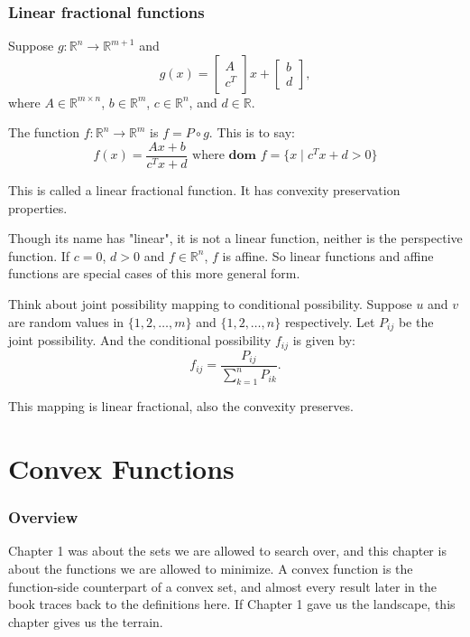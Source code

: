 \documentclass[lang=en,color=blue,mode=fancy,titlestyle=hang]{elegantbook}
\begin{document}
\subsection{Linear fractional functions}

Suppose $g: \mathbb{R}^n \rightarrow \mathbb{R}^{m+1}$ and
\[
g(x)= \begin{bmatrix} A\\ c^T \end{bmatrix} x + \begin{bmatrix} b \\ d \end{bmatrix},
\]
where $A \in \mathbb{R}^{m \times n}$, $b \in \mathbb{R}^m$, $c \in \mathbb{R}^n$, and
$d \in \mathbb{R}$.

The function $f: \mathbb{R}^n \rightarrow \mathbb{R}^m$ is $f = P \circ g$. This is to say:
\[
f(x) = \frac{Ax + b}{c^{T}x + d} \text{ where } \textbf{dom } f = \{x \;|\; c^{T}x + d > 0\}
\]

This is called a linear fractional function. It has convexity preservation properties.

Though its name has "linear", it is not a linear function, neither is the perspective function.
If $c = 0$, $d > 0$ and $f \in \mathbb{R}^n$, $f$ is affine. So linear functions and affine
functions are special cases of this more general form.

Think about joint possibility mapping to conditional possibility. Suppose $u$ and $v$ are
random values in $\{1,  2, \ldots, m\}$ and $\{1, 2, \ldots, n\}$ respectively. Let $P_{ij}$
be the joint possibility. And the conditional possibility $f_{ij}$ is given by:
\[
f_{ij} = \frac{P_{ij}}{\sum_{k=1}^{n} P_{ik}}.
\]

This mapping is linear fractional, also the convexity preserves.

\chapter{Convex Functions}

\subsection*{Overview}

Chapter 1 was about the sets we are allowed to search over, and this chapter is about the
functions we are allowed to minimize. A convex function is the function-side counterpart of
a convex set, and almost every result later in the book traces back to the definitions
here. If Chapter 1 gave us the landscape, this chapter gives us the terrain.
\end{document}
